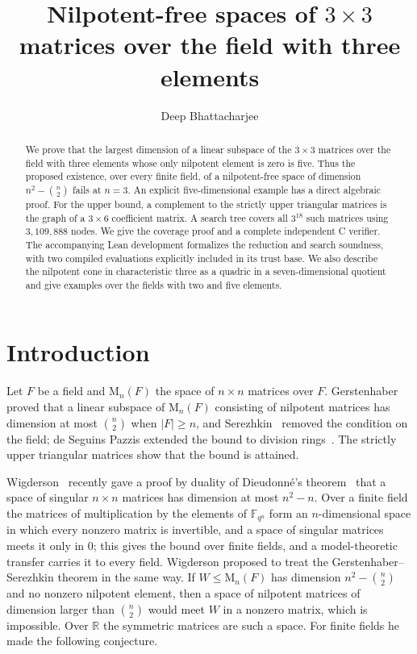 \documentclass[screen]{aomart}
\title[Nilpotent-free matrix spaces over F3]{\texorpdfstring{Nilpotent-free spaces of $3\times3$ matrices over the field with three elements}{Nilpotent-free spaces of 3 by 3 matrices over the field with three elements}}
\author{Deep Bhattacharjee}
\theoremstyle{definition}
\theoremstyle{remark}
\numberwithin{equation}{section}
\newcommand{\F}{\mathbb{F}}
\newcommand{\M}{\mathrm{M}}
\begin{document}
\begin{abstract}
We prove that the largest dimension of a linear subspace of the $3\times3$ matrices over the field with three elements whose only nilpotent element is zero is five. Thus the proposed existence, over every finite field, of a nilpotent-free space of dimension $n^2-\binom n2$ fails at $n=3$. An explicit five-dimensional example has a direct algebraic proof. For the upper bound, a complement to the strictly upper triangular matrices is the graph of a $3\times6$ coefficient matrix. A search tree covers all $3^{18}$ such matrices using $3{,}109{,}888$ nodes. We give the coverage proof and a complete independent C verifier. The accompanying Lean development formalizes the reduction and search soundness, with two compiled evaluations explicitly included in its trust base. We also describe the nilpotent cone in characteristic three as a quadric in a seven-dimensional quotient and give examples over the fields with two and five elements.
\end{abstract}
\maketitle
\section{Introduction}

Let $F$ be a field and $\M_n(F)$ the space of $n\times n$ matrices over $F$. Gerstenhaber~\cite{Ge} proved that a linear subspace of $\M_n(F)$ consisting of nilpotent matrices has dimension at most $\binom n2$ when $|F|\ge n$, and Serezhkin~\cite{Se} removed the condition on the field; de Seguins Pazzis extended the bound to division rings~\cite{dSP}. The strictly upper triangular matrices show that the bound is attained.

Wigderson~\cite{Wi} recently gave a proof by duality of Dieudonn\'e's theorem~\cite{Di,Me} that a space of singular $n\times n$ matrices has dimension at most $n^2-n$. Over a finite field the matrices of multiplication by the elements of $\F_{q^n}$ form an $n$-dimensional space in which every nonzero matrix is invertible, and a space of singular matrices meets it only in $0$; this gives the bound over finite fields, and a model-theoretic transfer carries it to every field. Wigderson proposed to treat the Gersten\-haber--\hspace{0pt}Serezhkin theorem in the same way. If $W\le\M_n(F)$ has dimension $n^2-\binom n2$ and no nonzero nilpotent element, then a space of nilpotent matrices of dimension larger than $\binom n2$ would meet $W$ in a nonzero matrix, which is impossible. Over $\mathbb R$ the symmetric matrices are such a space. For finite fields he made the following conjecture.
\end{document}
